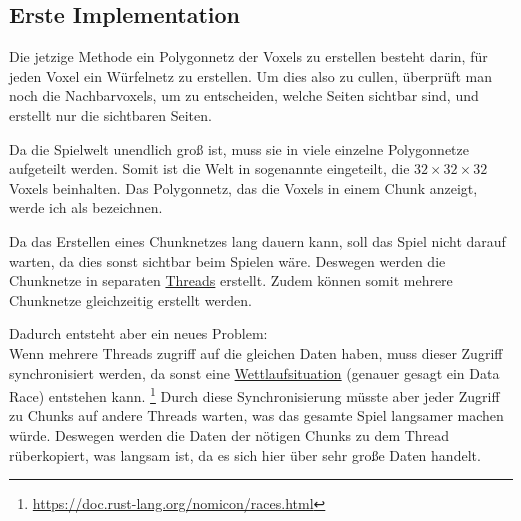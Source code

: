 \subsection{Erste Implementation}

Die jetzige Methode ein Polygonnetz der Voxels
zu erstellen besteht darin, für jeden Voxel
ein Würfelnetz zu erstellen.
Um dies also zu cullen, überprüft man
noch die Nachbarvoxels, um zu entscheiden,
welche Seiten sichtbar sind, und erstellt nur
die sichtbaren Seiten.


Da die Spielwelt unendlich groß ist, muss sie
in viele einzelne Polygonnetze aufgeteilt werden.
Somit ist die Welt in sogenannte 
eingeteilt, die $32 \times 32 \times 32$ Voxels
beinhalten. Das Polygonnetz, das die Voxels in einem
Chunk anzeigt, werde ich als
 bezeichnen.


Da das Erstellen eines Chunknetzes lang dauern kann,
soll das Spiel nicht darauf warten,
da dies sonst sichtbar beim Spielen wäre.
Deswegen werden die Chunknetze in separaten
\href{https://de.wikipedia.org/wiki/Thread_(Informatik)}{Threads}
erstellt.
Zudem können somit mehrere Chunknetze gleichzeitig
erstellt werden.

\vspace{0.3cm}



\vspace{0.3cm}

Dadurch entsteht aber ein neues Problem: \\
Wenn mehrere Threads zugriff auf die gleichen Daten
haben, muss dieser Zugriff synchronisiert werden,
da sonst eine
\href{https://de.wikipedia.org/wiki/Wettlaufsituation}{Wettlaufsituation}
(genauer gesagt ein Data Race) entstehen kann.
\footnote{\url{https://doc.rust-lang.org/nomicon/races.html}}
Durch diese Synchronisierung müsste aber jeder Zugriff
zu Chunks auf andere Threads warten, was das gesamte
Spiel langsamer machen würde. Deswegen werden die
Daten der nötigen Chunks zu dem Thread rüberkopiert,
was langsam ist, da es sich hier über sehr große Daten
handelt.

